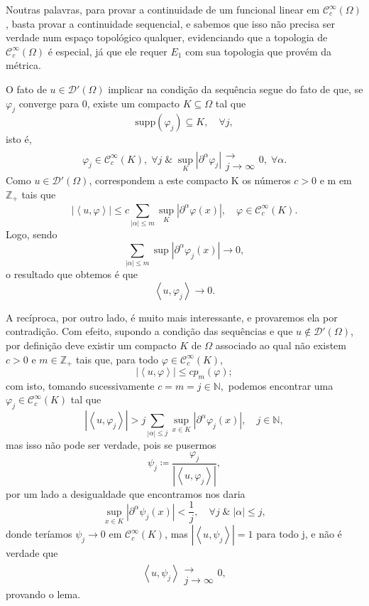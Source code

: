 \documentclass[../distribution_theory_notes.tex]{subfiles}
\begin{document}
Noutras palavras, para provar a continuidade de um funcional linear em \(\mathcal{C}_{c}^{\infty}(\Omega )\), basta provar a continuidade sequencial, e sabemos que isso não precisa ser verdade num espaço topológico qualquer, evidenciando que a topologia de \(\mathcal{C}_{c}^{\infty}(\Omega )\) é especial, já que ele requer \(E_1\) com sua topologia que provém da métrica.
\begin{proof*}
	O fato de \(u\in \mathcal{D}'(\Omega )\) implicar na condição da sequência segue do fato de que, se \(\varphi_{j}\) converge para 0, existe um compacto \(K\subseteq \Omega \) tal que
	\[
		\mathrm{supp}(\varphi_{j})\subseteq K,\quad \forall j,
	\]
	isto é,
	\[\varphi_{j}\in \mathcal{C}_{c}^{\infty}(K),\; \forall j\;\&\; \sup_{K}| \partial^{\alpha }\varphi_{j} |\substack{ \\ \longrightarrow \\ j\to \infty}0,\; \forall \alpha .\]
	Como \(u\in \mathcal{D}'(\Omega )\), correspondem a este compacto K os números \(c>0\) e m em \(\mathbb{Z}_{+}\) tais que
	\[
		| \left< u, \varphi  \right> | \leq c \sum\limits_{| \alpha  |\leq m}^{}\sup_{K}| \partial^{\alpha }\varphi (x) |,\quad \varphi \in \mathcal{C}_{c}^{\infty}(K).
	\]
	Logo, sendo
	\[
		\sum\limits_{| \alpha  |\leq m}^{} \sup_{}| \partial^{\alpha }\varphi_{j}(x) |\to 0,
	\]
	o resultado que obtemos é que
	\[
		\left< u, \varphi_{j} \right>\to 0.
	\]

	A recíproca, por outro lado, é muito mais interessante, e provaremos ela por contradição. Com efeito, supondo a condição das sequências e que \(u\not\in \mathcal{D}'(\Omega )\), por definição deve existir um compacto \(K\) de \(\Omega \) associado ao qual não existem \(c > 0\) e \(m\in \mathbb{Z}_{+}\) tais que, para todo \(\varphi \in \mathcal{C}_{c}^{\infty}(K)\),
	\[
		| \left< u, \varphi  \right> | \leq cp_{m}(\varphi );
	\]
	com isto, tomando sucessivamente \(c=m=j\in \mathbb{N},\) podemos encontrar uma \(\varphi_{j}\in \mathcal{C}_{c}^{\infty}(K)\) tal que
	\[
		| \left< u, \varphi_{j} \right> | > j \sum\limits_{| \alpha  |\leq j}^{}\sup_{x\in K}| \partial^{\alpha }\varphi_{j}(x) |,\quad j\in \mathbb{N},
	\]
	mas isso não pode ser verdade, pois se pusermos
	\[
		\psi_{j}\coloneqq \frac{\varphi_{j}}{| \left< u, \varphi_{j} \right> |},
	\]
	por um lado a desigualdade que encontramos nos daria
	\[
		\sup_{x\in K} | \partial^{\alpha }\psi_{j}(x) | < \frac{1}{j},\quad \forall j\;\&\; | \alpha  |\leq j,
	\]
	donde teríamos \(\psi_{j}\to 0\) em \(\mathcal{C}_{c}^{\infty}(K)\), mas \(| \left< u, \psi_{j} \right> | = 1\) para todo j, e não é verdade que
	\[
		\left< u, \psi_{j} \right>\substack{ \\ \longrightarrow \\ j\to \infty}0,
	\]
	provando o lema. \qedsymbol
\end{proof*}
\end{document}
